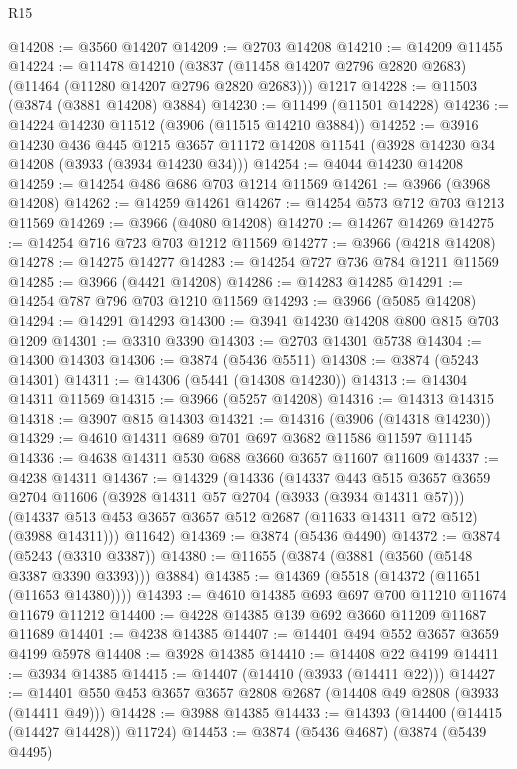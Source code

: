\begin{lexlean}{R15}
\begin{coremodule}
@14208 := @3560 @14207
@14209 := @2703 @14208
@14210 := @14209 @11455
@14224 := @11478
    @14210
    (@3837 (@11458 @14207 @2796 @2820 @2683) (@11464 (@11280 @14207 @2796 @2820 @2683)))
    @1217
@14228 := @11503 (@3874 (@3881 @14208) @3884)
@14230 := @11499 (@11501 @14228)
@14236 := @14224 @14230 @11512 (@3906 (@11515 @14210 @3884))
@14252 := @3916
    @14230
    @436
    @445
    @1215
    @3657
    @11172
    @14208
    @11541
    (@3928 @14230 @34 @14208 (@3933 (@3934 @14230 @34)))
@14254 := @4044 @14230 @14208
@14259 := @14254 @486 @686 @703 @1214 @11569
@14261 := @3966 (@3968 @14208)
@14262 := @14259 @14261
@14267 := @14254 @573 @712 @703 @1213 @11569
@14269 := @3966 (@4080 @14208)
@14270 := @14267 @14269
@14275 := @14254 @716 @723 @703 @1212 @11569
@14277 := @3966 (@4218 @14208)
@14278 := @14275 @14277
@14283 := @14254 @727 @736 @784 @1211 @11569
@14285 := @3966 (@4421 @14208)
@14286 := @14283 @14285
@14291 := @14254 @787 @796 @703 @1210 @11569
@14293 := @3966 (@5085 @14208)
@14294 := @14291 @14293
@14300 := @3941 @14230 @14208 @800 @815 @703 @1209
@14301 := @3310 @3390
@14303 := @2703 @14301 @5738
@14304 := @14300 @14303
@14306 := @3874 (@5436 @5511)
@14308 := @3874 (@5243 @14301)
@14311 := @14306 (@5441 (@14308 @14230))
@14313 := @14304 @14311 @11569
@14315 := @3966 (@5257 @14208)
@14316 := @14313 @14315
@14318 := @3907 @815 @14303
@14321 := @14316 (@3906 (@14318 @14230))
@14329 := @4610 @14311 @689 @701 @697 @3682 @11586 @11597 @11145
@14336 := @4638 @14311 @530 @688 @3660 @3657 @11607 @11609
@14337 := @4238 @14311
@14367 := @14329
    (@14336
      (@14337
        @443
        @515
        @3657
        @3659
        @2704
        @11606
        (@3928 @14311 @57 @2704 (@3933 (@3934 @14311 @57)))
        (@14337 @513 @453 @3657 @3657 @512 @2687 (@11633 @14311 @72 @512) (@3988 @14311)))
      @11642)
@14369 := @3874 (@5436 @4490)
@14372 := @3874 (@5243 (@3310 @3387))
@14380 := @11655 (@3874 (@3881 (@3560 (@5148 @3387 @3390 @3393))) @3884)
@14385 := @14369 (@5518 (@14372 (@11651 (@11653 @14380))))
@14393 := @4610 @14385 @693 @697 @700 @11210 @11674 @11679 @11212
@14400 := @4228 @14385 @139 @692 @3660 @11209 @11687 @11689
@14401 := @4238 @14385
@14407 := @14401 @494 @552 @3657 @3659 @4199 @5978
@14408 := @3928 @14385
@14410 := @14408 @22 @4199
@14411 := @3934 @14385
@14415 := @14407 (@14410 (@3933 (@14411 @22)))
@14427 := @14401 @550 @453 @3657 @3657 @2808 @2687 (@14408 @49 @2808 (@3933 (@14411 @49)))
@14428 := @3988 @14385
@14433 := @14393 (@14400 (@14415 (@14427 @14428)) @11724)
@14453 := @3874
    (@5436 @4687)
    (@3874
      (@5439 @4495)

\end{coremodule}
\end{lexlean}
